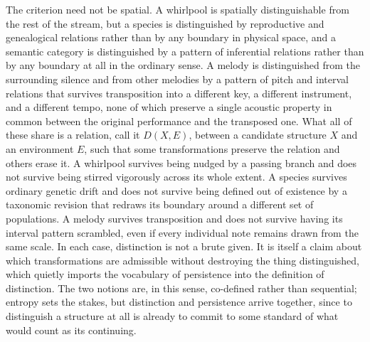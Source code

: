 \documentclass[11pt]{article}
\begin{document}
The criterion need not be spatial. A whirlpool is spatially distinguishable from the rest of the stream, but a species is distinguished by reproductive and genealogical relations rather than by any boundary in physical space, and a semantic category is distinguished by a pattern of inferential relations rather than by any boundary at all in the ordinary sense. A melody is distinguished from the surrounding silence and from other melodies by a pattern of pitch and interval relations that survives transposition into a different key, a different instrument, and a different tempo, none of which preserve a single acoustic property in common between the original performance and the transposed one. What all of these share is a relation, call it $D(X, E)$, between a candidate structure $X$ and an environment $E$, such that some transformations preserve the relation and others erase it. A whirlpool survives being nudged by a passing branch and does not survive being stirred vigorously across its whole extent. A species survives ordinary genetic drift and does not survive being defined out of existence by a taxonomic revision that redraws its boundary around a different set of populations. A melody survives transposition and does not survive having its interval pattern scrambled, even if every individual note remains drawn from the same scale. In each case, distinction is not a brute given. It is itself a claim about which transformations are admissible without destroying the thing distinguished, which quietly imports the vocabulary of persistence into the definition of distinction. The two notions are, in this sense, co-defined rather than sequential; entropy sets the stakes, but distinction and persistence arrive together, since to distinguish a structure at all is already to commit to some standard of what would count as its continuing.
\end{document}
